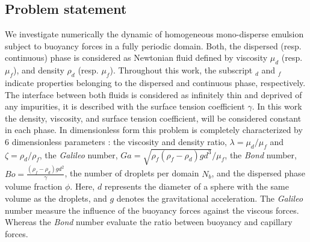 

\subsection{Problem statement}
We investigate numerically the dynamic of homogeneous mono-disperse emulsion subject to buoyancy forces in a fully periodic domain. 
Both, the dispersed (resp. continuous) phase is considered as Newtonian fluid defined by viscosity $\mu_d$ (resp. $\mu_f$), and density $\rho_d$ (resp. $\mu_f$).
Throughout this work, the subscript $_d$ and $_f$ indicate properties belonging to the dispersed and continuous phase, respectively. 
The interface between both fluids is considered as infinitely thin and deprived of any impurities, it is described with the surface tension coefficient $\gamma$. 
In this work the density, viscosity, and surface tension coefficient, will be considered constant in each phase.
In dimensionless form this problem is completely characterized by $6$ dimensionless parameters :  the viscosity and density ratio, $\lambda = \mu_d / \mu_f$ and $\zeta = \rho_d / \rho_f$,  
the \textit{Galileo} number, 
$
    Ga =\sqrt{\rho_f(\rho_f - \rho_d) g d^3} / \mu_f
$,
the \textit{Bond} number, 
$
    Bo =\frac{(\rho_f - \rho_d) g d^2}{\gamma}
$,
the number of droplets per domain $N_b$, and the dispersed phase volume fraction $\phi$. 
Here, $d$ represents the diameter of a sphere with the same volume as the droplets, and $g$ denotes the gravitational acceleration.
The \textit{Galileo} number measure the influence of the buoyancy forces against the viscous forces.
Whereas the \textit{Bond} number evaluate the ratio between buoyancy and capillary forces. 

